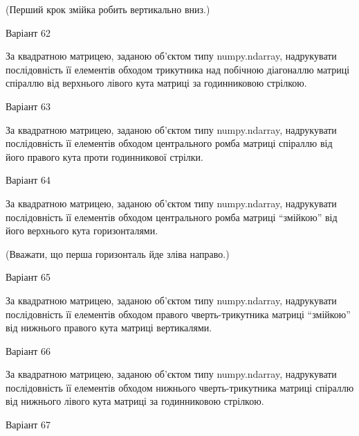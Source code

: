\documentclass[11pt, ukrainian]{article}
\begin{document}
(Перший крок змійка робить вертикально вниз.)


{\Large \center  Варіант  62\par \bigskip\bigskip}

За квадратною матрицею, заданою об'єктом типу numpy.ndarray, надрукувати послідовність її елементів обходом трикутника над побічною діагоналлю матриці спіраллю від верхнього лівого кута матриці за годинниковою стрілкою.





{\Large \center  Варіант  63\par \bigskip\bigskip}

За квадратною матрицею, заданою об'єктом типу numpy.ndarray, надрукувати послідовність її елементів обходом центрального ромба матриці спіраллю від його правого кута проти годинникової стрілки.





{\Large \center  Варіант  64\par \bigskip\bigskip}

За квадратною матрицею, заданою об'єктом типу numpy.ndarray, надрукувати послідовність її елементів обходом центрального ромба матриці ``змійкою'' від його верхнього кута горизонталями.


(Вважати, що перша горизонталь йде зліва направо.)


{\Large \center  Варіант  65\par \bigskip\bigskip}

За квадратною матрицею, заданою об'єктом типу numpy.ndarray, надрукувати послідовність її елементів обходом правого чверть-трикутника матриці ``змійкою'' від нижнього правого кута матриці вертикалями.





{\Large \center  Варіант  66\par \bigskip\bigskip}

За квадратною матрицею, заданою об'єктом типу numpy.ndarray, надрукувати послідовність її елементів обходом нижнього чверть-трикутника матриці спіраллю від нижнього лівого кута матриці за годинниковою стрілкою.





{\Large \center  Варіант  67\par \bigskip\bigskip}
\end{document}
